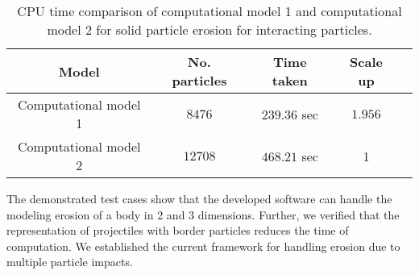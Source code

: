 \begin{table}[!htpb]
\centering
\begin{tabular}{c c c c c}
  \hline
  Model & No. particles & Time taken & Scale up  \\
  \hline
  Computational model 1 & $8476$ & $239.36$ sec & $1.956$ \\
  Computational model 2 & $12708$ & $468.21$ sec & 1 \\
\end{tabular}
\caption{CPU time comparison of computational model 1 and computational model 2
  for solid particle erosion for interacting particles.}
\label{table:mpe-1-time-comparison}
\end{table}
The demonstrated test cases show that the developed software can handle the
modeling erosion of a body in 2 and 3 dimensions. Further, we verified that the
representation of projectiles with border particles reduces the time of
computation. We established the current framework for handling erosion due to
multiple particle impacts.
